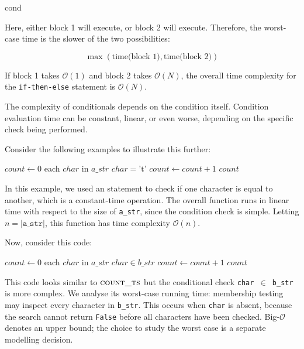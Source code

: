 \begin{codebox}
    \li \If cond \Then
    \li     {}
    \li \Else
    \li     {}
    \li \End
\end{codebox}


Here, either block 1 will execute, or block 2 will execute. Therefore, the worst-case time is the slower of the two possibilities:

\[
\max (\text{time(block 1)}, \text{time(block 2)})
\]

If block 1 takes $\mathcal{O}(1)$ and block 2 takes $\mathcal{O}(N)$, the overall time complexity for the \texttt{if-then-else} statement is $\mathcal{O}(N)$.

The complexity of conditionals depends on the condition itself. Condition evaluation time can be constant, linear, or even worse, depending on the specific check being performed.

Consider the following examples to illustrate this further:

\begin{codebox}
    \li $count \gets 0$
    \li \For each $char$ in $a\_str$ \Do
    \li     \If $char = \text{'t'}$ \Then
    \li         $count \gets count + 1$
            \End
        \End
    \li \Return $count$
\end{codebox}


In this example, we used an \texttt{\If} statement to check if one character is equal to another, which is a constant-time operation. The overall function runs in linear time with respect to the size of \texttt{a\_str}, since the condition check is simple. Letting $n = |\texttt{a\_str}|$, this function has time complexity $\mathcal{O}(n)$.

Now, consider this code:

\begin{codebox}
    \li $count \gets 0$
    \li \For each $char$ in $a\_str$ \Do
    \li     \If $char \in b\_str$ \Then
    \li         $count \gets count + 1$
            \End
        \End
    \li \Return $count$
\end{codebox}

This code looks similar to $\proc{count\_ts}$ but the conditional check \texttt{char $\in$ b\_str} is more complex. We analyse its worst-case running time: membership testing may inspect every character in \texttt{b\_str}. This occurs when \texttt{char} is absent, because the search cannot return \texttt{False} before all characters have been checked. Big-$\mathcal{O}$ denotes an upper bound; the choice to study the worst case is a separate modelling decision.

